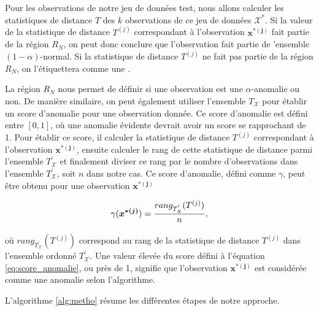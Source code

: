 Pour \DIFdelbegin {}\DIFdelend \DIFaddbegin {}\DIFaddend les observations de notre jeu de données test, nous allons calculer les statistiques de distance $T$ des $k$ observations de ce jeu de données $\mathcal{X^*}$. Si la valeur de la statistique de distance $T^{(j)}$ correspondant à l'observation $\boldsymbol{x^{*(j)}}$ fait partie de la région $R_N$, on peut donc conclure que l'observation fait partie de \DIFdelbegin {}\DIFdelend \DIFaddbegin {}\DIFaddend 'ensemble $(1-\alpha)$-normal\DIFaddbegin {}\DIFaddend . Si la statistique de distance $T^{(j)}$ ne fait pas partie de la région $R_N$, on l'étiquettera comme une \DIFdelbegin {}\DIFdelend \DIFaddbegin {}\DIFaddend .

La région $R_N$ nous permet de définir si une observation est une $\alpha$-anomalie ou non. De manière similaire, on peut également utiliser l'ensemble $T_{\mathcal{X}}$ pour établir un score d'anomalie pour une observation donnée. Ce score d'anomalie est défini entre $[0,1]$, où une anomalie évidente devrait avoir un score se rapprochant de 1. Pour établir ce score, il \DIFdelbegin {}\DIFdelend \DIFaddbegin {}\DIFaddend calculer la statistique de distance $T^{(j)}$ correspondant à l'observation $\boldsymbol{x^{*(j)}}$, ensuite \DIFdelbegin {}\DIFdelend calculer le rang de cette statistique de distance parmi l'ensemble $T^{'}_{\mathcal{X}}$ et finalement diviser ce rang par le nombre d'observations dans l'ensemble $T^{'}_{\mathcal{X}}$, soit $n$ dans notre cas. Ce score d'anomalie, défini comme $\gamma$, peut \DIFaddbegin {}\DIFaddend être obtenu pour une observation $\boldsymbol{x^{*(j)}}$ \DIFdelbegin \DIFdel{:
}\DIFdelend \DIFaddbegin {}\DIFaddend 

\begin{gather} \label{eq:score_anomalie}
	\gamma(\boldsymbol{x^{*(j)}}) = \frac{rang_{T^{'}_{\mathcal{X}}}(T^{(j)})}{n}\DIFaddbegin \DIFadd{,
}\DIFaddend \end{gather}

où $rang_{T^{'}_{\mathcal{X}}}(T^{(j)})$ correspond au rang de la statistique de distance $T^{(j)}$ dans l'ensemble ordonné $T^{'}_{\mathcal{X}}$. Une valeur élevée du score défini à l'équation \ref{eq:score_anomalie}, ou près de 1, signifie que l'observation $\boldsymbol{x^{*(j)}}$ est considérée comme une anomalie selon l'algorithme.

L'algorithme \ref{alg:metho} résume les différentes étapes de notre approche.

